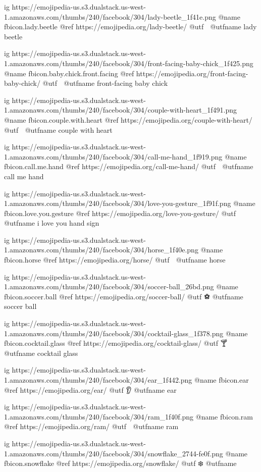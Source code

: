   ig https://emojipedia-us.s3.dualstack.us-west-1.amazonaws.com/thumbs/240/facebook/304/lady-beetle_1f41e.png
  @name fbicon.lady.beetle
  @ref https://emojipedia.org/lady-beetle/
  @utf 🐞
  @utfname lady beetle

  ig https://emojipedia-us.s3.dualstack.us-west-1.amazonaws.com/thumbs/240/facebook/304/front-facing-baby-chick_1f425.png
  @name fbicon.baby.chick.front.facing
  @ref https://emojipedia.org/front-facing-baby-chick/
  @utf 🐥
  @utfname front-facing baby chick

  ig https://emojipedia-us.s3.dualstack.us-west-1.amazonaws.com/thumbs/240/facebook/304/couple-with-heart_1f491.png
  @name fbicon.couple.with.heart
  @ref https://emojipedia.org/couple-with-heart/
  @utf 💑
  @utfname couple with heart

  ig https://emojipedia-us.s3.dualstack.us-west-1.amazonaws.com/thumbs/240/facebook/304/call-me-hand_1f919.png
  @name fbicon.call.me.hand
  @ref https://emojipedia.org/call-me-hand/
  @utf 🤙
  @utfname call me hand

  ig https://emojipedia-us.s3.dualstack.us-west-1.amazonaws.com/thumbs/240/facebook/304/love-you-gesture_1f91f.png
  @name fbicon.love.you.gesture
  @ref https://emojipedia.org/love-you-gesture/
  @utf 🤟
  @utfname i love you hand sign

  ig https://emojipedia-us.s3.dualstack.us-west-1.amazonaws.com/thumbs/240/facebook/304/horse_1f40e.png
  @name fbicon.horse
  @ref https://emojipedia.org/horse/
  @utf 🐎
  @utfname horse

  ig https://emojipedia-us.s3.dualstack.us-west-1.amazonaws.com/thumbs/240/facebook/304/soccer-ball_26bd.png
  @name fbicon.soccer.ball
  @ref https://emojipedia.org/soccer-ball/
  @utf ⚽
  @utfname soccer ball

  ig https://emojipedia-us.s3.dualstack.us-west-1.amazonaws.com/thumbs/240/facebook/304/cocktail-glass_1f378.png
  @name fbicon.cocktail.glass
  @ref https://emojipedia.org/cocktail-glass/
  @utf 🍸
  @utfname cocktail glass

  ig https://emojipedia-us.s3.dualstack.us-west-1.amazonaws.com/thumbs/240/facebook/304/ear_1f442.png
  @name fbicon.ear
  @ref https://emojipedia.org/ear/
  @utf 👂
  @utfname ear

  ig https://emojipedia-us.s3.dualstack.us-west-1.amazonaws.com/thumbs/240/facebook/304/ram_1f40f.png
  @name fbicon.ram
  @ref https://emojipedia.org/ram/
  @utf 🐏
  @utfname ram

  ig https://emojipedia-us.s3.dualstack.us-west-1.amazonaws.com/thumbs/240/facebook/304/snowflake_2744-fe0f.png
  @name fbicon.snowflake
  @ref https://emojipedia.org/snowflake/
  @utf ❄️
  @utfname


